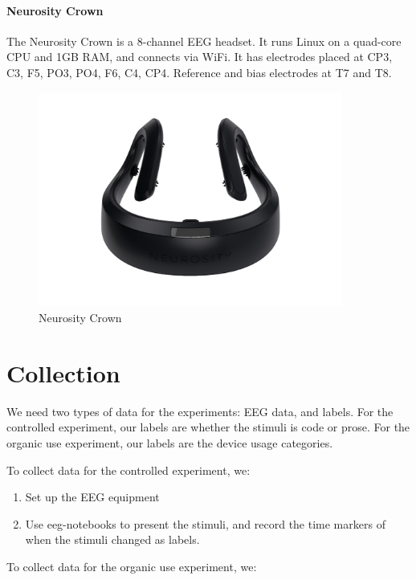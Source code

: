     \begin{minipage}{\textwidth}
        \paragraph*{Neurosity Crown}
        The Neurosity Crown is a 8-channel EEG headset. It runs Linux on a quad-core CPU and 1GB RAM, and connects via WiFi. It has electrodes placed at CP3, C3, F5, PO3, PO4, F6, C4, CP4. Reference and bias electrodes at T7 and T8.

        \begin{figure}[H]
            \centering
            \includegraphics[trim=0 100 0 100,clip,width=100mm]{img/crown-1.png}
            \caption{Neurosity Crown}\label{fig:crown}
        \end{figure}
    \end{minipage}

\pagebreak
\section{Collection}

We need two types of data for the experiments: EEG data, and labels. For the controlled experiment, our labels are whether the stimuli is code or prose. For the organic use experiment, our labels are the device usage categories.

To collect data for the controlled experiment, we:

\begin{enumerate}
    \item Set up the EEG equipment
    \item Use eeg-notebooks to present the stimuli, and record the time markers of when the stimuli changed as labels.
\end{enumerate}

To collect data for the organic use experiment, we:


